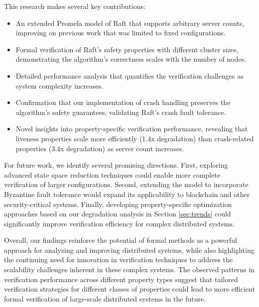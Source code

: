     This research makes several key contributions:
    
    \begin{itemize}
        \item An extended Promela model of Raft that supports arbitrary server counts, improving on previous work \cite{Qx1} that was limited to fixed configurations.
        
        \item Formal verification of Raft's safety properties with different cluster sizes, demonstrating the algorithm's correctness scales with the number of nodes.
        
        \item Detailed performance analysis that quantifies the verification challenges as system complexity increases.
        
        \item Confirmation that our implementation of crash handling preserves the algorithm's safety guarantees, validating Raft's crash fault tolerance.
        
        \item Novel insights into property-specific verification performance, revealing that liveness properties scale more efficiently (1.4x degradation) than crash-related properties (3.4x degradation) as server count increases.
    \end{itemize}
    
    For future work, we identify several promising directions. First, exploring advanced state space reduction techniques could enable more complete verification of larger configurations. Second, extending the model to incorporate Byzantine fault tolerance \cite{Qx6, Qx8, Castro} would expand its applicability to blockchain and other security-critical systems. Finally, developing property-specific optimization approaches based on our degradation analysis in Section \ref{sec:trends} could significantly improve verification efficiency for complex distributed systems.
    
    Overall, our findings reinforce the potential of formal methods as a powerful approach for analyzing and improving distributed systems, while also highlighting the continuing need for innovation in verification techniques to address the scalability challenges inherent in these complex systems. The observed patterns in verification performance across different property types suggest that tailored verification strategies for different classes of properties could lead to more efficient formal verification of large-scale distributed systems in the future.
    